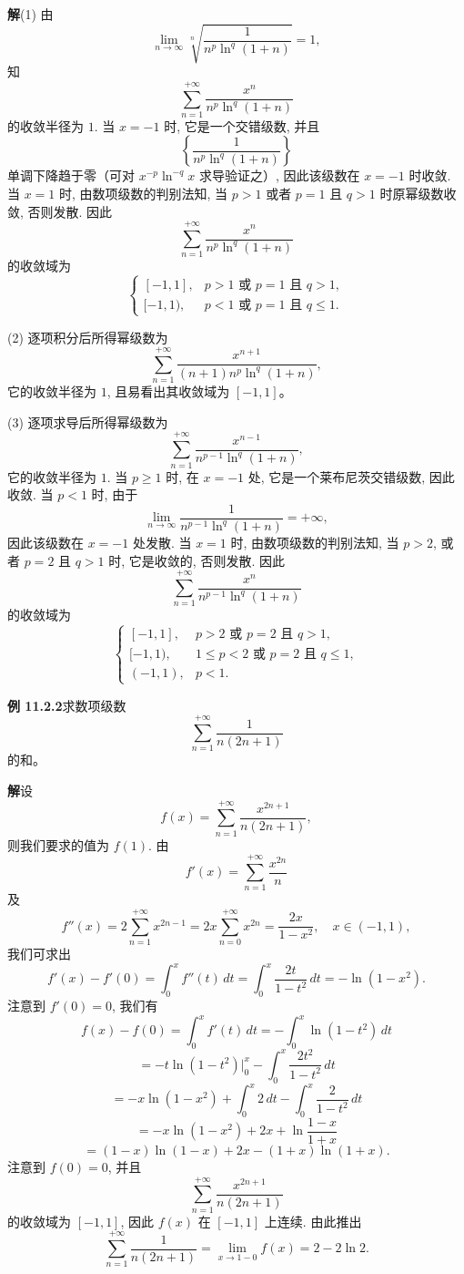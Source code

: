 \documentclass[UTF8, 12pt, fontset=fandol, oneside]{ctexart}
\begin{document}
\noindent\textbf{解}\quad (1) 由
\[
  \lim_{n\to\infty}
  \sqrt[n]{\frac1{n^p\ln^q(1+n)}}=1,
\]
知
\[
  \sum_{n=1}^{+\infty}\frac{x^n}{n^p\ln^q(1+n)}
\]
的收敛半径为 $1$. 当 $x=-1$ 时, 它是一个交错级数, 并且
\[
  \left\{\frac1{n^p\ln^q(1+n)}\right\}
\]
单调下降趋于零（可对 $x^{-p}\ln^{-q}x$ 求导验证之）, 因此该级数在 $x=-1$ 时收敛. 当 $x=1$ 时, 由数项级数的判别法知, 当 $p>1$ 或者 $p=1$ 且 $q>1$ 时原幂级数收敛, 否则发散. 因此
\[
  \sum_{n=1}^{+\infty}\frac{x^n}{n^p\ln^q(1+n)}
\]
的收敛域为
\[
  \begin{cases}
    [-1,1], & p>1\text{ 或 }p=1\text{ 且 }q>1,\\
    [-1,1), & p<1\text{ 或 }p=1\text{ 且 }q\leqslant1.
  \end{cases}
\]

(2) 逐项积分后所得幂级数为
\[
  \sum_{n=1}^{+\infty}
  \frac{x^{n+1}}{(n+1)n^p\ln^q(1+n)},
\]
它的收敛半径为 $1$, 且易看出其收敛域为 $[-1,1]$。

(3) 逐项求导后所得幂级数为
\[
  \sum_{n=1}^{+\infty}\frac{x^{n-1}}{n^{p-1}\ln^q(1+n)},
\]
它的收敛半径为 $1$. 当 $p\geqslant1$ 时, 在 $x=-1$ 处, 它是一个莱布尼茨交错级数, 因此收敛. 当 $p<1$ 时, 由于
\[
  \lim_{n\to\infty}\frac1{n^{p-1}\ln^q(1+n)}=+\infty,
\]
因此该级数在 $x=-1$ 处发散. 当 $x=1$ 时, 由数项级数的判别法知, 当 $p>2$, 或者 $p=2$ 且 $q>1$ 时, 它是收敛的, 否则发散. 因此
\[
  \sum_{n=1}^{+\infty}\frac{x^n}{n^{p-1}\ln^q(1+n)}
\]
的收敛域为
\[
  \begin{cases}
    [-1,1], & p>2\text{ 或 }p=2\text{ 且 }q>1,\\
    [-1,1), & 1\leqslant p<2\text{ 或 }p=2\text{ 且 }q\leqslant1,\\
    (-1,1), & p<1.
  \end{cases}
\]

\noindent\textbf{例 11.2.2}\quad 求数项级数
\[
  \sum_{n=1}^{+\infty}\frac1{n(2n+1)}
\]
的和。

\noindent\textbf{解}\quad 设
\[
  f(x)=\sum_{n=1}^{+\infty}\frac{x^{2n+1}}{n(2n+1)},
\]
则我们要求的值为 $f(1)$. 由
\[
  f'(x)=\sum_{n=1}^{+\infty}\frac{x^{2n}}n
\]
及
\[
  f''(x)=2\sum_{n=1}^{+\infty}x^{2n-1}
  =2x\sum_{n=0}^{+\infty}x^{2n}
  =\frac{2x}{1-x^2},\quad x\in(-1,1),
\]
我们可求出
\[
  f'(x)-f'(0)=\int_0^x f''(t)\,dt
  =
  \int_0^x\frac{2t}{1-t^2}\,dt
  =
  -\ln(1-x^2).
\]
注意到 $f'(0)=0$, 我们有
\[
  f(x)-f(0)
  =
  \int_0^x f'(t)\,dt
  =
  -\int_0^x\ln(1-t^2)\,dt
\]
\[
  =
  -t\ln(1-t^2)\Big|_0^x
  -
  \int_0^x\frac{2t^2}{1-t^2}\,dt
\]
\[
  =
  -x\ln(1-x^2)+\int_0^x2\,dt-\int_0^x\frac2{1-t^2}\,dt
\]
\[
  =
  -x\ln(1-x^2)+2x+\ln\frac{1-x}{1+x}
\]
\[
  =
  (1-x)\ln(1-x)+2x-(1+x)\ln(1+x).
\]
注意到 $f(0)=0$, 并且
\[
  \sum_{n=1}^{+\infty}\frac{x^{2n+1}}{n(2n+1)}
\]
的收敛域为 $[-1,1]$, 因此 $f(x)$ 在 $[-1,1]$ 上连续. 由此推出
\[
  \sum_{n=1}^{+\infty}\frac1{n(2n+1)}
  =
  \lim_{x\to1-0}f(x)
  =
  2-2\ln2.
\]
\end{document}
